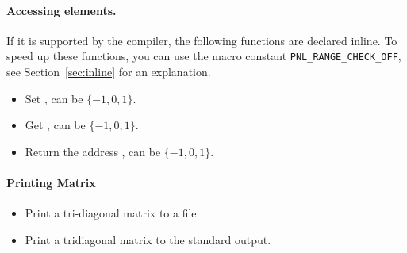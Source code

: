 \paragraph{Accessing elements.}

If it is supported by the compiler, the following functions are declared
inline. To speed up these functions, you can use the macro constant
\texttt{PNL_RANGE_CHECK_OFF}, see Section~\ref{sec:inline} for an explanation. 
\begin{itemize}
  \item {}
    \sshortdescribe Set ,  can be $\{-1, 0, 1\}$.  
  \item {}
    \sshortdescribe Get ,  can be $\{-1, 0, 1\}$.  
  \item {}
    \sshortdescribe Return the address ,  can be $\{-1, 0, 1\}$.  
\end{itemize}

\paragraph{Printing Matrix}
\begin{itemize}
  \item {}
    \sshortdescribe Print a tri-diagonal matrix to a file.  
  \item {}
    \sshortdescribe Print a tridiagonal matrix to the standard output.  
\end{itemize}

